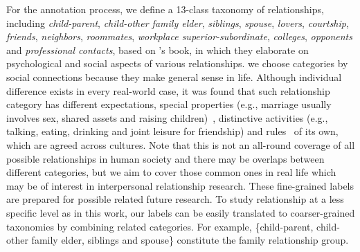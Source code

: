 For the annotation process, we define a 13-class taxonomy of relationships, 
including {\em child-parent}, {\em child-other family elder}, {\em siblings}, {\em spouse}, {\em lovers}, {\em courtship}, {\em friends}, {\em neighbors}, {\em roommates}, 
{\em workplace superior-subordinate}, {\em colleges}, {\em opponents} and 
{\em professional contacts},
based on \citeauthor{encyclopaedia}'s book, 
in which they elaborate on psychological 
and social aspects of various relationships. 
we choose categories by social connections because they make general 
sense in life. Although individual difference exists 
in every real-world case, it was found that such relationship category has different expectations, 
special properties (e.g., marriage usually involves sex, 
shared assets and raising children)~\cite{class-property}, 
distinctive activities (e.g., talking, eating, drinking and 
joint leisure for friendship) and 
rules~\cite{class-rules} of its own, which are agreed across cultures.
Note that this is not an all-round coverage of 
all possible relationships in human society and there may be
overlaps between different categories, but we aim to cover those common
ones in real life which may be of interest in interpersonal 
relationship research.
These fine-grained labels are prepared for possible related future research.
To study relationship at a less specific level as in this work, 
our labels can be easily translated to coarser-grained taxonomies 
by combining related categories. For example, \{child-parent, child-other family elder, siblings and spouse\} constitute the family relationship group.

